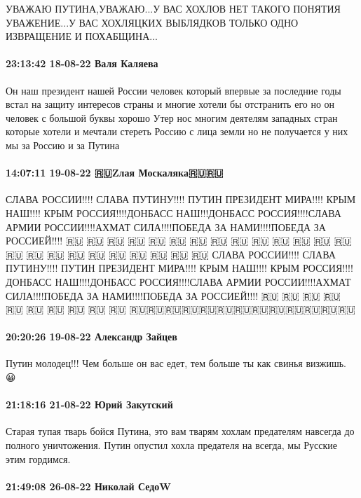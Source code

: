 УВАЖАЮ ПУТИНА,УВАЖАЮ...У ВАС ХОХЛОВ НЕТ ТАКОГО ПОНЯТИЯ УВАЖЕНИЕ...У ВАС
ХОХЛЯЦКИХ ВЫБЛЯДКОВ ТОЛЬКО ОДНО ИЗВРАЩЕНИЕ И ПОХАБЩИНА...

\paragraph{23:13:42 18-08-22 Валя Каляева}

Он наш президент нашей России человек который впервые за последние годы встал
на защиту интересов страны и многие хотели бы отстранить его но он человек с
большой буквы хорошо Утер нос многим деятелям западных стран которые хотели и
мечтали стереть Россию с лица земли но не получается у них мы за Россию и за
Путина

\paragraph{14:07:11 19-08-22 🇷🇺Zлая Москаляка🇷🇺🇷🇺}

СЛАВА РОССИИ!!!! СЛАВА ПУТИНУ!!!! ПУТИН ПРЕЗИДЕНТ МИРА!!!! КРЫМ НАШ!!!! КРЫМ
РОССИЯ!!!!ДОНБАСС НАШ!!!ДОНБАСС РОССИЯ!!!!СЛАВА АРМИИ РОССИИ!!!!АХМАТ
СИЛА!!!!ПОБЕДА ЗА НАМИ!!!!ПОБЕДА ЗА РОССИЕЙ!!!!  🇷🇺 🇷🇺 🇷🇺 🇷🇺 🇷🇺 🇷🇺
🇷🇺 🇷🇺 🇷🇺 🇷🇺 🇷🇺 🇷🇺 🇷🇺 🇷🇺 🇷🇺 🇷🇺 🇷🇺 🇷🇺 🇷🇺 🇷🇺 🇷🇺 🇷🇺
🇷🇺 🇷🇺 СЛАВА РОССИИ!!!! СЛАВА ПУТИНУ!!!! ПУТИН ПРЕЗИДЕНТ МИРА!!!! КРЫМ
НАШ!!!! КРЫМ РОССИЯ!!!! ДОНБАСС НАШ!!!!ДОНБАСС РОССИЯ!!!!СЛАВА АРМИИ
РОССИИ!!!!АХМАТ СИЛА!!!!ПОБЕДА ЗА НАМИ!!!!ПОБЕДА ЗА РОССИЕЙ!!!!  🇷🇺 🇷🇺 🇷🇺
🇷🇺 🇷🇺 🇷🇺 🇷🇺 🇷🇺 🇷🇺 🇷🇺
🇷🇺🇷🇺🇷🇺🇷🇺🇷🇺🇷🇺🇷🇺🇷🇺🇷🇺🇷🇺🇷🇺🇷🇺🇷🇺

\paragraph{20:20:26 19-08-22 Александр Зайцев}

Путин молодец!!! Чем больше он вас едет, тем больше ты как свинья визжишь. 😀

\paragraph{21:18:16 21-08-22 Юрий Закутский}

Старая тупая тварь бойся Путина, это вам тварям хохлам предателям навсегда до
полного уничтожения. Путин опустил хохла предателя на всегда, мы Русские этим
гордимся.

\paragraph{21:49:08 26-08-22 Николай СедоW}

